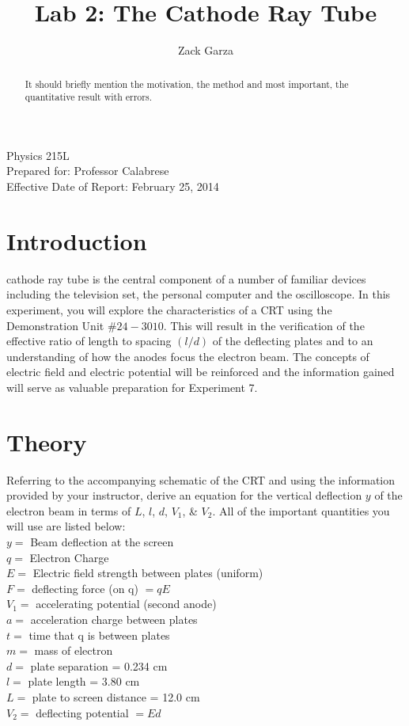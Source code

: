 \documentclass[twocolumn,english,amsmath,amssymb]{IEEEtran}
\theoremstyle{plain}
\theoremstyle{plain}
\begin{document}
\title{Lab 2: The Cathode Ray Tube}


\author{Zack Garza}


\IEEEspecialpapernotice
{Physics 215L \\
Prepared for: Professor Calabrese \\
Effective Date of Report: February 25, 2014}


\maketitle
\begin{abstract}
It should briefly mention the motivation, the method and
most important, the quantitative result with errors.
\end{abstract}

\section{Introduction}



 cathode ray tube is the central component
of a number of familiar devices including the television set, the
personal computer and the oscilloscope. In this experiment, you will
explore the characteristics of a CRT using the Demonstration Unit
$\#24-3010$. This will result in the verification of the effective ratio
of length to spacing $(l/d)$ of the deflecting plates and to an understanding
of how the anodes focus the electron beam. The concepts of electric
field and electric potential will be reinforced and the information
gained will serve as valuable preparation for Experiment 7.


\section{Theory}
Referring to the accompanying schematic of the CRT and using the information provided by your instructor, derive an equation for the vertical deflection $y$ of the electron beam in terms of $L$, $l$, $d$, $V_1$, \& $V_2$. All of the important quantities you will use are listed below: \\

\noindent $y=$ Beam deflection at the screen \\
$q=$ Electron Charge \\
$E=$ Electric field strength between plates (uniform) \\
$F=$ deflecting force (on q) $=qE$ \\
$V_1=$ accelerating potential (second anode) \\
$a=$ acceleration charge between plates \\
$t=$ time that q is between plates \\
$m=$ mass of electron \\
$d=$ plate separation = 0.234 cm \\
$l=$ plate length = 3.80 cm \\
$L=$ plate to screen distance = 12.0 cm \\
$V_2=$ deflecting potential $=Ed$ \\
\end{document}
